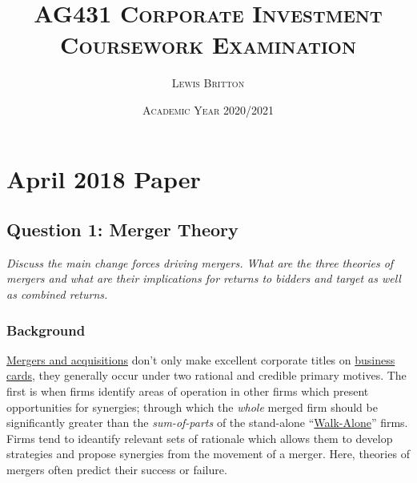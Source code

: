 \documentclass[11pt, english]{article}
\begin{document}

        \title{\textsc{AG431 Corporate Investment\\ Coursework Examination}}
        \author{\textsc{Lewis Britton}}
        \date{\textsc{Academic Year 2020/2021}}
        \maketitle

\newpage


        \renewcommand{\contentsname}{Table of Contents}

        \tableofcontents

\newpage


\section{April 2018 Paper}

	\subsection{Question 1: Merger Theory}

	\textit{Discuss the main change forces driving mergers. What are the three theories of mergers and what are their implications for returns to bidders and target as well as combined returns.}

		\subsubsection*{Background}	

	\href{https://www.youtube.com/watch?v=0RMKEZzbkuo}{Mergers and acquisitions} don't only make excellent corporate titles on \href{https://www.youtube.com/watch?v=cISYzA36-ZY}{business cards}, they generally occur under two rational and credible primary motives. The first is when firms identify areas of operation in other firms which present opportunities for synergies; through which the \textit{whole} merged firm should be significantly greater than the \textit{sum-of-parts} of the stand-alone ``\href{https://www.youtube.com/watch?v=KBgrU4vX16I}{Walk-Alone}'' firms. Firms tend to ideantify relevant sets of rationale which allows them to develop strategies and propose synergies from the movement of a merger. Here, theories of mergers often predict their success or failure.\\
\end{document}
